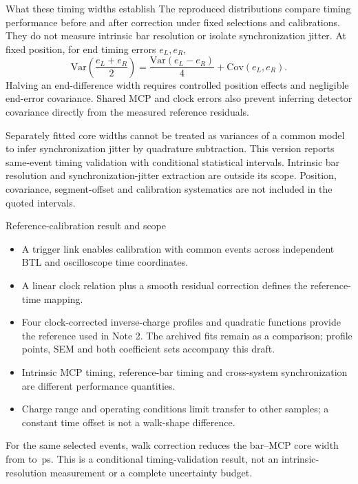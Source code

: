 \begin{frame}{What these timing widths establish}
\small
The reproduced distributions compare timing performance before and after
correction under fixed selections and calibrations. They do not measure
intrinsic bar resolution or isolate synchronization jitter.
At fixed position, for end timing errors $e_L,e_R$,
\[
\mathrm{Var}\!\left(\frac{e_L+e_R}{2}\right)
=\frac{\mathrm{Var}(e_L-e_R)}{4}+\mathrm{Cov}(e_L,e_R).
\]
Halving an end-difference width requires controlled position effects and
negligible end-error covariance. Shared MCP and clock errors also prevent
inferring detector covariance directly from the measured reference residuals.

Separately fitted core widths cannot be treated as variances of a common model
to infer synchronization jitter by quadrature subtraction.
This version reports same-event timing validation with conditional statistical
intervals. Intrinsic bar resolution and synchronization-jitter extraction are
outside its scope. Position, covariance, segment-offset and calibration
systematics are not included in the quoted intervals.
\end{frame}

\begin{frame}{Reference-calibration result and scope}
\small
\begin{itemize}
\item A trigger link enables calibration with common events across independent
BTL and oscilloscope time coordinates.
\item A linear clock relation plus a smooth residual correction defines
the reference-time mapping.
\item Four clock-corrected inverse-charge profiles and quadratic functions
provide the reference used in Note 2. The archived fits remain as a comparison;
profile points, SEM and both coefficient sets accompany this draft.
\item Intrinsic MCP timing, reference-bar timing and cross-system
synchronization are different performance quantities.
\item Charge range and operating conditions limit transfer to other
samples; a constant time offset is not a walk-shape difference.
\end{itemize}
\medskip
For the same selected events, walk correction reduces the bar--MCP core width
from \RBefore{} to \RAfter\,ps. This is a conditional timing-validation result,
not an intrinsic-resolution measurement or a complete uncertainty budget.
\end{frame}

